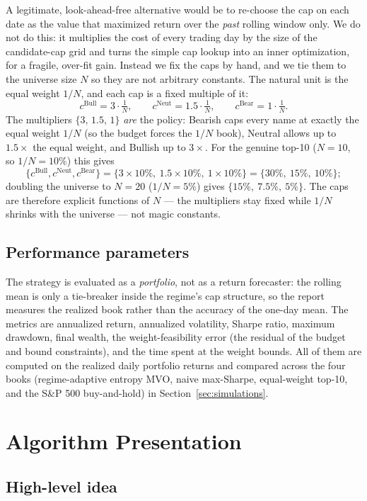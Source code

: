 \documentclass[a4paper,12pt]{article}
\begin{document}
A legitimate, look-ahead-free alternative would be to re-choose the cap on each date as the value that maximized return over the \emph{past} rolling window only. We do not do this: it multiplies the cost of every trading day by the size of the candidate-cap grid and turns the simple cap lookup into an inner optimization, for a fragile, over-fit gain. Instead we fix the caps by hand, and we tie them to the universe size $N$ so they are not arbitrary constants. The natural unit is the equal weight $1/N$, and each cap is a fixed multiple of it:
\[
c^{\text{Bull}}=3\cdot\tfrac{1}{N},\qquad
c^{\text{Neut}}=1.5\cdot\tfrac{1}{N},\qquad
c^{\text{Bear}}=1\cdot\tfrac{1}{N}.
\]
The multipliers $\{3,\,1.5,\,1\}$ \emph{are} the policy: Bearish caps every name at exactly the equal weight $1/N$ (so the budget forces the $1/N$ book), Neutral allows up to $1.5\times$ the equal weight, and Bullish up to $3\times$. For the genuine top-10 ($N=10$, so $1/N=10\%$) this gives
\[
\{c^{\text{Bull}},c^{\text{Neut}},c^{\text{Bear}}\}=\{3\times10\%,\ 1.5\times10\%,\ 1\times10\%\}=\{30\%,\ 15\%,\ 10\%\};
\]
doubling the universe to $N=20$ ($1/N=5\%$) gives $\{15\%,\ 7.5\%,\ 5\%\}$. The caps are therefore explicit functions of $N$ --- the multipliers stay fixed while $1/N$ shrinks with the universe --- not magic constants.

\subsection{Performance parameters}

The strategy is evaluated as a \emph{portfolio}, not as a return forecaster: the rolling mean is only a tie-breaker inside the regime's cap structure, so the report measures the realized book rather than the accuracy of the one-day mean. The metrics are annualized return, annualized volatility, Sharpe ratio, maximum drawdown, final wealth, the weight-feasibility error (the residual of the budget and bound constraints), and the time spent at the weight bounds. All of them are computed on the realized daily portfolio returns and compared across the four books (regime-adaptive entropy MVO, naive max-Sharpe, equal-weight top-10, and the S\&P 500 buy-and-hold) in Section~\ref{sec:simulations}.

\section{Algorithm Presentation}

\subsection{High-level idea}
\end{document}
